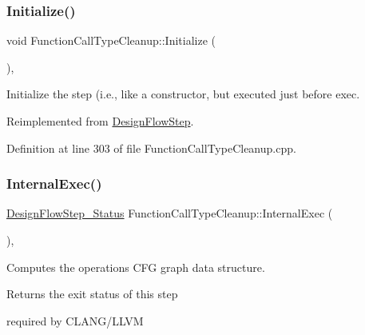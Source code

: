 \mbox{\label{classFunctionCallTypeCleanup_ab3d6a5c58f07a1c7c8bb7af316aee7c3}} 
\subsubsection{\texorpdfstring{Initialize()}{Initialize()}}
{\footnotesize\ttfamily void Function\+Call\+Type\+Cleanup\+::\+Initialize (\begin{DoxyParamCaption}{ }\end{DoxyParamCaption})\hspace{0.3cm}{\ttfamily [override]}, {\ttfamily [virtual]}}



Initialize the step (i.\+e., like a constructor, but executed just before exec. 



Reimplemented from \hyperlink{classDesignFlowStep_a44b50683382a094976e1d432a7784799}{Design\+Flow\+Step}.



Definition at line 303 of file Function\+Call\+Type\+Cleanup.\+cpp.

\mbox{\label{classFunctionCallTypeCleanup_a2e3a025dd337bafdd96b26071ab18e69}} 
\subsubsection{\texorpdfstring{Internal\+Exec()}{InternalExec()}}
{\footnotesize\ttfamily \hyperlink{design__flow__step_8hpp_afb1f0d73069c26076b8d31dbc8ebecdf}{Design\+Flow\+Step\+\_\+\+Status} Function\+Call\+Type\+Cleanup\+::\+Internal\+Exec (\begin{DoxyParamCaption}{ }\end{DoxyParamCaption})\hspace{0.3cm}{\ttfamily [override]}, {\ttfamily [virtual]}}



Computes the operations C\+FG graph data structure. 

\begin{DoxyReturn}{Returns}
the exit status of this step 
\end{DoxyReturn}
required by C\+L\+A\+N\+G/\+L\+L\+VM

